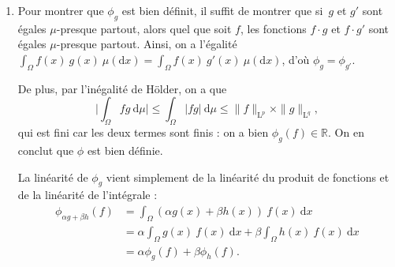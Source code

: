 \documentclass{../../td}
\begin{document}
  \begin{enumerate}
    \item \label{ex2-q1} Pour montrer que $\phi_g$ est bien définit, il suffit de montrer que si~$g$ et $g'$ sont égales $\mu$-presque partout, alors quel que soit $f$, les fonctions $f\cdot g$ et $f \cdot g'$ sont égales $\mu$-presque partout.
      Ainsi, on a l'égalité $\int_\Omega f(x)\:g(x)\:\mu(\mathrm{d}x) = \int_\Omega f(x)\:g'(x)\:\mu(\mathrm{d}x)$, d'où $\phi_g = \phi_{g'}$.

      De plus, par l'inégalité de Hölder, on a que \[
        \Big|\int_\Omega f g\: \mathrm{d}\mu\Big|\le \int_\Omega |f g| \:\mathrm{d}\mu \le \|f\|_{\mathrm{L}^p} \times \|g\|_{\mathrm{L}^q}
      ,\]
      qui est fini car les deux termes sont finis : on a bien $\phi_g(f) \in \mathds{R}$.
      On en conclut que $\phi$ est bien définie.

      La linéarité de $\phi_g$ vient simplement de la linéarité du produit de fonctions et de la linéarité de l'intégrale :
      \begin{align*}
      \phi_{\alpha g + \beta h}(f) &= \int_\Omega (\alpha g(x) + \beta h(x))\: f(x)\:\mathrm{d}x\\
      &= \alpha \int_\Omega g(x)\:f(x)\:\mathrm{d}x + \beta \int_\Omega h(x)\:f(x)\:\mathrm{d}x\\
      &= \alpha \phi_g(f) + \beta \phi_h(f)
      .\end{align*}


\end{enumerate}
\end{document}
